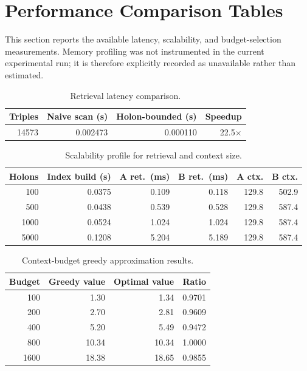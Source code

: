 \documentclass[10pt,a4paper]{article}
\begin{document}
\section{Performance Comparison Tables}
\label{sec:performance}
This section reports the available latency, scalability, and budget-selection measurements. Memory profiling was not instrumented in the current experimental run; it is therefore explicitly recorded as unavailable rather than estimated.

\begin{table}[H]
\centering
\caption{Retrieval latency comparison.}
\label{tab:latency}
\small
\begin{tabular}{rrrr}
\toprule
\textbf{Triples} & \textbf{Naive scan (s)} & \textbf{Holon-bounded (s)} & \textbf{Speedup} \\
\midrule
14573 & 0.002473 & 0.000110 & 22.5$\times$ \\
\bottomrule
\end{tabular}
\end{table}

\begin{table}[H]
\centering
\caption{Scalability profile for retrieval and context size.}
\label{tab:scalability}
\small
\begin{tabular}{rrrrrr}
\toprule
\textbf{Holons} & \textbf{Index build (s)} & \textbf{A ret.\ (ms)} & \textbf{B ret.\ (ms)} & \textbf{A ctx.} & \textbf{B ctx.} \\
\midrule
100 & 0.0375 & 0.109 & 0.118 & 129.8 & 502.9 \\
500 & 0.0438 & 0.539 & 0.528 & 129.8 & 587.4 \\
1000 & 0.0524 & 1.024 & 1.024 & 129.8 & 587.4 \\
5000 & 0.1208 & 5.204 & 5.189 & 129.8 & 587.4 \\
\bottomrule
\end{tabular}
\end{table}

\begin{table}[H]
\centering
\caption{Context-budget greedy approximation results.}
\label{tab:knapsack}
\small
\begin{tabular}{rrrr}
\toprule
\textbf{Budget} & \textbf{Greedy value} & \textbf{Optimal value} & \textbf{Ratio} \\
\midrule
100 & 1.30 & 1.34 & 0.9701 \\
200 & 2.70 & 2.81 & 0.9609 \\
400 & 5.20 & 5.49 & 0.9472 \\
800 & 10.34 & 10.34 & 1.0000 \\
1600 & 18.38 & 18.65 & 0.9855 \\
\bottomrule
\end{tabular}
\end{table}
\end{document}
